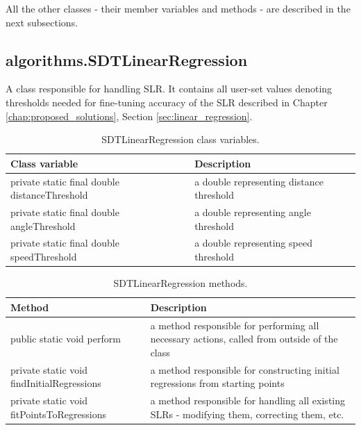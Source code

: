 	All the other classes - their member variables and methods - are described in the next subsections.
	
\newpage
	
\subsection{algorithms.SDTLinearRegression}\label{subsec:slr}

	A class responsible for handling SLR. It contains all user-set values denoting thresholds needed for fine-tuning accuracy of the SLR described in Chapter \ref{chap:proposed_solutions}, Section \ref{sec:linear_regression}.
	
\begin{table}[H]
\centering
\setlength{\extrarowheight}{2pt}
\begin{tabularx}{\textwidth}{|X|X|}
\hline
\textbf{Class variable} & \textbf{Description} \\ \hline
private static final double \mbox{distanceThreshold} & a double representing distance threshold \\ \hline
private static final double \mbox{angleThreshold} & a double representing angle threshold    \\ \hline
private static final double \mbox{speedThreshold} & a double representing speed threshold    \\ \hline
\end{tabularx}
\caption{SDTLinearRegression class variables.}
\label{tab:class_variables_LR}
\end{table}

\begin{table}[H]
\centering
\setlength{\extrarowheight}{2pt}
\begin{tabularx}{\textwidth}{|X|X|}
\hline
\textbf{Method} & \textbf{Description} \\ \hline
public static void \mbox{perform} & a method responsible for performing all necessary actions, called from outside of the class \\ \hline
private static void \mbox{findInitialRegressions} & a method responsible for constructing initial regressions from starting points\\ \hline
private static void \mbox{fitPointsToRegressions} & a method responsible for handling all existing SLRs - modifying them, correcting them, etc.\\ \hline
\end{tabularx}
\caption{SDTLinearRegression methods.}
\label{tab:class_methods_LR}
\end{table}

